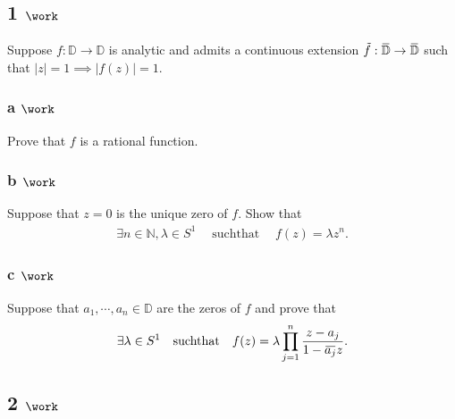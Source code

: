 \hypertarget{work-70}{%
\subsection{\texorpdfstring{1
\(\work\)}{1 \textbackslash work}}\label{work-70}}

Suppose \(f:{\mathbb{D}}\to{\mathbb{D}}\) is analytic and admits a
continuous extension
\(\tilde f: \mkern 1.5mu\overline{\mkern-1.5mu{\mathbb{D}}\mkern-1.5mu}\mkern 1.5mu\to \mkern 1.5mu\overline{\mkern-1.5mu{\mathbb{D}}\mkern-1.5mu}\mkern 1.5mu\)
such that
\({\left\lvert {z} \right\rvert} = 1 \implies {\left\lvert {f(z)} \right\rvert} = 1\).

\hypertarget{a-work}{%
\subsubsection{\texorpdfstring{a
\(\work\)}{a \textbackslash work}}\label{a-work}}

Prove that \(f\) is a rational function.

\hypertarget{b-work}{%
\subsubsection{\texorpdfstring{b
\(\work\)}{b \textbackslash work}}\label{b-work}}

Suppose that \(z=0\) is the unique zero of \(f\). Show that
\begin{align*}  
\exists n\in {\mathbb{N}}, \lambda \in S^1 {\quad \operatorname{ such that } \quad}f(z) = \lambda z^n
.\end{align*}

\hypertarget{c-work}{%
\subsubsection{\texorpdfstring{c
\(\work\)}{c \textbackslash work}}\label{c-work}}

Suppose that \(a_1, \cdots, a_n \in {\mathbb{D}}\) are the zeros of
\(f\) and prove that
\begin{align*}  
\exists \lambda \in S^1 {\quad \operatorname{such that} \quad} f(z) = \lambda \prod_{j=1}^n {z - a_j \over 1 - \mkern 1.5mu\overline{\mkern-1.5mua_j\mkern-1.5mu}\mkern 1.5mu z}
.\end{align*}

\hypertarget{work-71}{%
\subsection{\texorpdfstring{2
\(\work\)}{2 \textbackslash work}}\label{work-71}}


